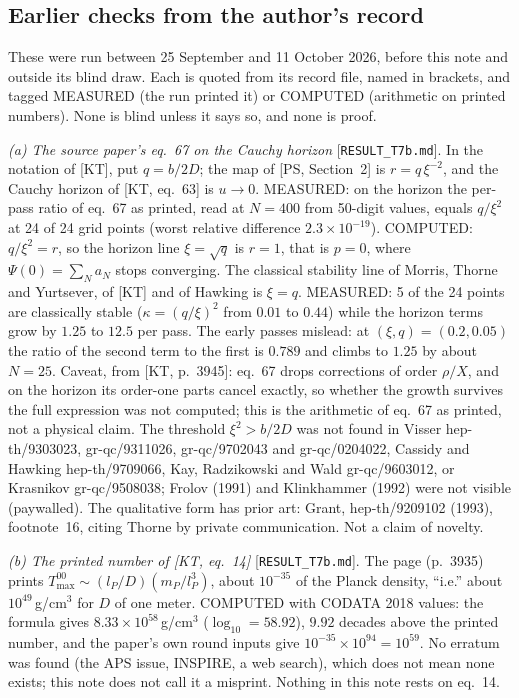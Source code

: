 \documentclass[11pt]{article}
\newcommand{\rec}[1]{\nolinkurl{#1}}
\begin{document}
\subsection{Earlier checks from the author's record}\label{sec:earlier}
\begingroup\sloppy

These were run between 25 September and 11 October 2026, before this note and outside its blind draw. Each is quoted from its record file, named in brackets, and tagged MEASURED (the run printed it) or COMPUTED (arithmetic on printed numbers). None is blind unless it says so, and none is proof.

\medskip
\noindent\emph{(a) The source paper's eq.~67 on the Cauchy horizon} [\rec{RESULT_T7b.md}]. In the notation of [KT], put $q=b/2D$; the map of [PS, Section~2] is $r=q\,\xi^{-2}$, and the Cauchy horizon of [KT, eq.~63] is $u\to0$. MEASURED: on the horizon the per-pass ratio of eq.~67 as printed, read at $N=400$ from 50-digit values, equals $q/\xi^2$ at 24 of 24 grid points (worst relative difference $2.3\times10^{-19}$). COMPUTED: $q/\xi^2=r$, so the horizon line $\xi=\sqrt q$ is $r=1$, that is $p=0$, where $\Psi(0)=\sum_Na_N$ stops converging. The classical stability line of Morris, Thorne and Yurtsever, of [KT] and of Hawking is $\xi=q$. MEASURED: 5 of the 24 points are classically stable ($\kappa=(q/\xi)^2$ from $0.01$ to $0.44$) while the horizon terms grow by $1.25$ to $12.5$ per pass. The early passes mislead: at $(\xi,q)=(0.2,0.05)$ the ratio of the second term to the first is $0.789$ and climbs to $1.25$ by about $N=25$. Caveat, from [KT, p.~3945]: eq.~67 drops corrections of order $\rho/X$, and on the horizon its order-one parts cancel exactly, so whether the growth survives the full expression was not computed; this is the arithmetic of eq.~67 as printed, not a physical claim. The threshold $\xi^2>b/2D$ was not found in Visser hep-th/9303023, gr-qc/9311026, gr-qc/9702043 and gr-qc/0204022, Cassidy and Hawking hep-th/9709066, Kay, Radzikowski and Wald gr-qc/9603012, or Krasnikov gr-qc/9508038; Frolov (1991) and Klinkhammer (1992) were not visible (paywalled). The qualitative form has prior art: Grant, hep-th/9209102 (1993), footnote~16, citing Thorne by private communication. Not a claim of novelty.

\medskip
\noindent\emph{(b) The printed number of [KT, eq.~14]} [\rec{RESULT_T7b.md}]. The page (p.~3935) prints $T^{00}_{\max}\sim(l_P/D)(m_P/l_P^3)$, about $10^{-35}$ of the Planck density, ``i.e.'' about $10^{49}$\,g/cm$^3$ for $D$ of one meter. COMPUTED with CODATA 2018 values: the formula gives $8.33\times10^{58}$\,g/cm$^3$ ($\log_{10}=58.92$), $9.92$ decades above the printed number, and the paper's own round inputs give $10^{-35}\times10^{94}=10^{59}$. No erratum was found (the APS issue, INSPIRE, a web search), which does not mean none exists; this note does not call it a misprint. Nothing in this note rests on eq.~14.
\end{document}

